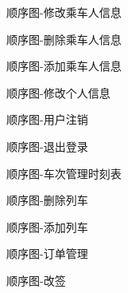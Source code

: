 \documentclass{article}
\begin{document}
	\begin{figure}[H]
		\centering
		
		\caption{顺序图-修改乘车人信息}
		\label{顺序图-修改乘车人信息}
	\end{figure}
	\begin{figure}[H]
		\centering
		
		\caption{顺序图-删除乘车人信息}
		\label{顺序图-删除乘车人信息}
	\end{figure}
	\begin{figure}[H]
		\centering
		
		\caption{顺序图-添加乘车人信息}
		\label{顺序图-添加乘车人信息}
	\end{figure}
	\begin{figure}[H]
		\centering
		
		\caption{顺序图-修改个人信息}
		\label{顺序图-修改个人信息询历史}
	\end{figure}
	\begin{figure}[H]
		\centering
		
		\caption{顺序图-用户注销}
		\label{顺序图-用户注销}
	\end{figure}
	\begin{figure}[H]
		\centering
		
		\caption{顺序图-退出登录}
		\label{顺序图-退出登录}
	\end{figure}
	\begin{figure}[H]
		\centering
		
		\caption{顺序图-车次管理时刻表}
		\label{顺序图-车次管理时刻表}
	\end{figure}
	\begin{figure}[H]
		\centering
		
		\caption{顺序图-删除列车}
		\label{顺序图-删除列车}
	\end{figure}
	\begin{figure}[H]
		\centering
		
		\caption{顺序图-添加列车}
		\label{顺序图-添加列车}
	\end{figure}
	\begin{figure}[H]
		\centering
		
		\caption{顺序图-订单管理}
		\label{顺序图-订单管理}
	\end{figure}
	\begin{figure}[H]
		\centering
		
		\caption{顺序图-改签}
		\label{顺序图-改签}
	\end{figure}
\end{document}
